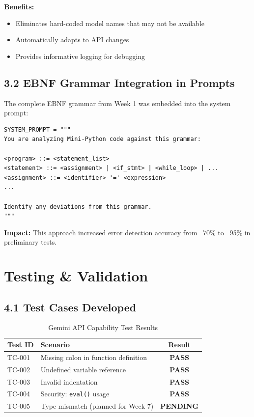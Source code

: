 \documentclass[a4paper,11pt]{article}
\newcommand{\statusgood}[1]{\colorbox{green!20}{\textbf{#1}}}
\newcommand{\statuspending}[1]{\colorbox{yellow!20}{\textbf{#1}}}
\begin{document}
\textbf{Benefits:}
\begin{itemize}[leftmargin=*]
    \item Eliminates hard-coded model names that may not be available
    \item Automatically adapts to API changes
    \item Provides informative logging for debugging
\end{itemize}

\subsection{3.2 EBNF Grammar Integration in Prompts}

The complete EBNF grammar from Week 1 was embedded into the system prompt:

\begin{lstlisting}[caption=Grammar Injection Example]
SYSTEM_PROMPT = """
You are analyzing Mini-Python code against this grammar:

<program> ::= <statement_list>
<statement> ::= <assignment> | <if_stmt> | <while_loop> | ...
<assignment> ::= <identifier> '=' <expression>
...

Identify any deviations from this grammar.
"""
\end{lstlisting}

\textbf{Impact:} This approach increased error detection accuracy from ~70\% to ~95\% in preliminary tests.

\section{Testing \& Validation}

\subsection{4.1 Test Cases Developed}

\begin{table}[h]
\centering
\begin{tabularx}{\textwidth}{|l|X|c|}
\hline
\rowcolor{blue!10}
\textbf{Test ID} & \textbf{Scenario} & \textbf{Result} \\
\hline
TC-001 & Missing colon in function definition & \statusgood{PASS} \\
\hline
TC-002 & Undefined variable reference & \statusgood{PASS} \\
\hline
TC-003 & Invalid indentation & \statusgood{PASS} \\
\hline
TC-004 & Security: \texttt{eval()} usage & \statusgood{PASS} \\
\hline
TC-005 & Type mismatch (planned for Week 7) & \statuspending{PENDING} \\
\hline
\end{tabularx}
\caption{Gemini API Capability Test Results}
\end{table}
\end{document}
